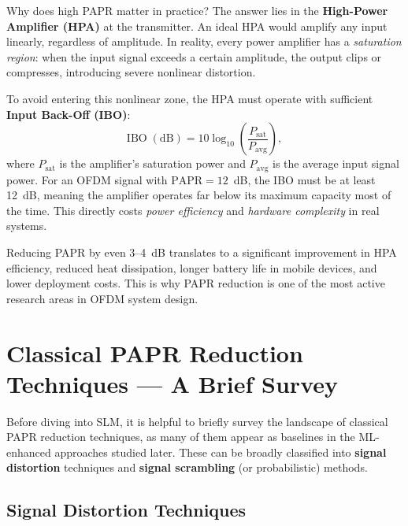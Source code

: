 Why does high PAPR matter in practice?  The answer lies in the \textbf{High-Power Amplifier (HPA)} at the transmitter. An ideal HPA would amplify any input linearly, regardless of amplitude. In reality, every power amplifier has a \emph{saturation region}: when the input signal exceeds a certain amplitude, the output clips or compresses, introducing severe nonlinear distortion.

To avoid entering this nonlinear zone, the HPA must operate with sufficient \textbf{Input Back-Off (IBO)}:
\begin{equation*}
    \mathrm{IBO\;(dB)} = 10\log_{10}\!\left(\frac{P_{\mathrm{sat}}}{P_{\mathrm{avg}}}\right),
\end{equation*}
where $P_{\mathrm{sat}}$ is the amplifier's saturation power and $P_{\mathrm{avg}}$ is the average input signal power.  For an OFDM signal with $\mathrm{PAPR} = 12$~dB, the IBO must be at least 12~dB, meaning the amplifier operates far below its maximum capacity most of the time. This directly costs \emph{power efficiency} and \emph{hardware complexity} in real systems.

\begin{keyinsight}
    Reducing PAPR by even 3--4~dB translates to a significant improvement in HPA efficiency, reduced heat dissipation, longer battery life in mobile devices, and lower deployment costs.  This is why PAPR reduction is one of the most active research areas in OFDM system design.
\end{keyinsight}


\section{Classical PAPR Reduction Techniques --- A Brief Survey}

Before diving into SLM, it is helpful to briefly survey the landscape of classical PAPR reduction techniques, as many of them appear as baselines in the ML-enhanced approaches studied later.  These can be broadly classified into \textbf{signal distortion} techniques and \textbf{signal scrambling} (or probabilistic) methods.

\subsection{Signal Distortion Techniques}

